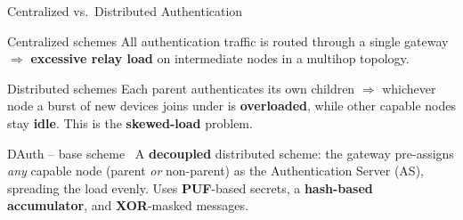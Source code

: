 \begin{frame}{Centralized vs.\ Distributed Authentication}
    \begin{block}{Centralized schemes}
        All authentication traffic is routed through a single gateway $\Rightarrow$
        \textbf{excessive relay load} on intermediate nodes in a multihop topology.
    \end{block}

    \begin{block}{Distributed schemes}
        Each parent authenticates its own children $\Rightarrow$ whichever node a burst of
        new devices joins under is \textbf{overloaded}, while other capable nodes stay \textbf{idle}.
        This is the \textbf{skewed-load} problem.
    \end{block}

    \vspace{0.2cm}
    \begin{alertblock}{DAuth -- base scheme~\cite{dauth}}
        A \textbf{decoupled} distributed scheme: the gateway pre-assigns \emph{any} capable node
        (parent \emph{or} non-parent) as the Authentication Server (AS), spreading the load evenly.
        Uses \textbf{PUF}-based secrets, a \textbf{hash-based accumulator}, and \textbf{XOR}-masked messages.
    \end{alertblock}
\end{frame}
